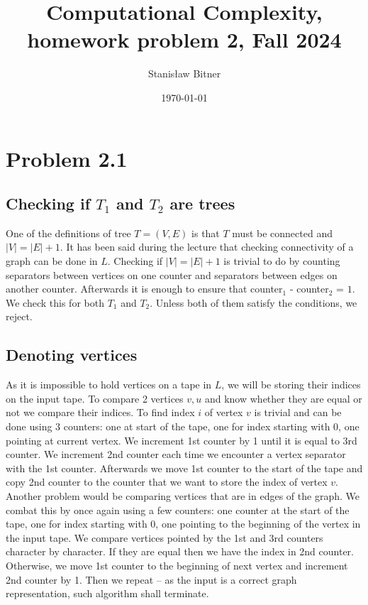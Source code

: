 \documentclass[11pt]{article}
\title{Computational Complexity, homework problem 2, Fall 2024}
\author{Stanisław Bitner}
\date{\today}
\begin{document}
\maketitle

\section{Problem 2.1}

\subsection{Checking if $T_1$ and $T_2$ are trees}
One of the definitions of tree $T = (V,E)$ is that $T$ must be connected and
$|V| = |E| + 1$. It has been said during the lecture that checking connectivity
of a graph can be done in $L$. Checking if $|V|=|E|+1$ is trivial to do by
counting separators between vertices on one counter and separators between edges
on another counter. Afterwards it is enough to ensure that counter$_1$
- counter$_2$ = $1$. We check this for both $T_1$ and $T_2$. Unless both of them
satisfy the conditions, we reject.

\subsection{Denoting vertices}
As it is impossible to hold vertices on a tape in $L$, we will be storing their
indices on the input tape. To compare 2 vertices $v, u$ and know whether they
are equal or not we compare their indices. To find index $i$ of vertex $v$ is
trivial and can be done using 3 counters: one at start of the tape, one for
index starting with 0, one pointing at current vertex. We increment 1st counter
by 1 until it is equal to 3rd counter. We increment 2nd counter each time we
encounter a vertex separator with the 1st counter. Afterwards we move 1st
counter to the start of the tape and copy 2nd counter to the counter that we
want to store the index of vertex $v$.\\
Another problem would be comparing vertices that are in edges of the graph. We
combat this by once again using a few counters: one counter at the start of the
tape, one for index starting with 0, one pointing to the beginning of the vertex
in the input tape. We compare vertices pointed by the 1st and 3rd counters
character by character. If they are equal then we have the index in 2nd
counter. Otherwise, we move 1st counter to the beginning of next vertex and
increment 2nd counter by 1. Then we repeat -- as the input is a correct graph
representation, such algorithm shall terminate.
\end{document}
